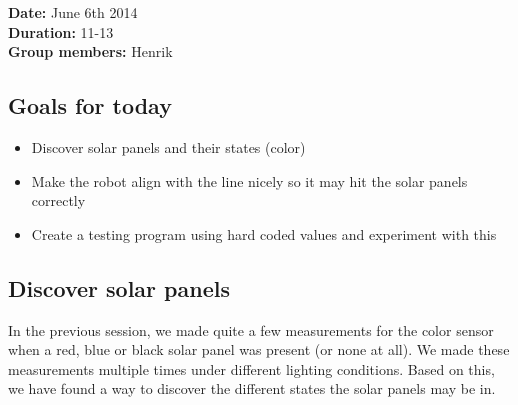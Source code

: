 \textbf{Date:} June 6th 2014\\\textbf{Duration:} 11-13\\\textbf{Group
members:} Henrik

\subsection{Goals for today}

\begin{itemize}
\item
  Discover solar panels and their states (color)
\item
  Make the robot align with the line nicely so it may hit the solar
  panels correctly
\item
  Create a testing program using hard coded values and experiment with
  this
\end{itemize}

\subsection{Discover solar panels}

In the previous session, we made quite a few measurements for the color
sensor when a red, blue or black solar panel was present (or none at
all). We made these measurements multiple times under different lighting
conditions. Based on this, we have found a way to discover the different
states the solar panels may be in.

